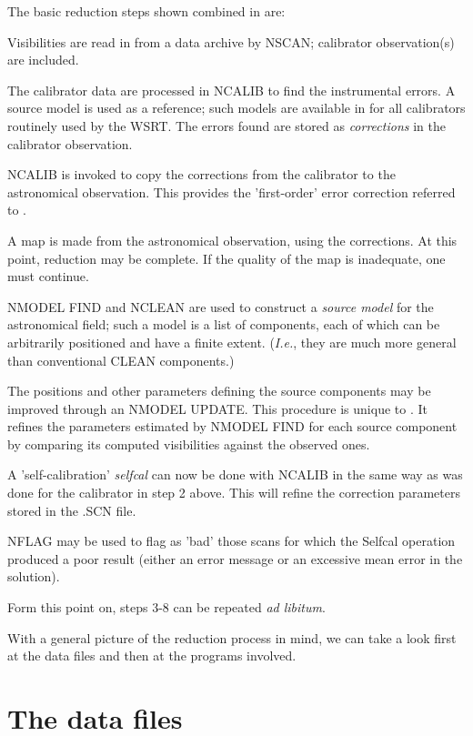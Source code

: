 	The basic reduction steps shown combined in 
are:
\bn
\item   Visibilities are read in from a data archive by NSCAN; calibrator
observation(s) are included.
\item   The calibrator data are processed in NCALIB to find the instrumental
errors. A source model is used as a reference; such models are available in
\NEWSTAR for all calibrators routinely used by the WSRT. The errors found are
stored as {\em corrections} in the calibrator observation.
\item   NCALIB is invoked to copy the corrections from the calibrator to the
astronomical observation. This provides the 'first-order' error correction
referred to .
\item   A map is made from the astronomical observation, using the corrections.
At this point, reduction may be complete. If the quality of the map is
inadequate, one must continue.
\item   NMODEL FIND and NCLEAN are used to construct a {\em source model} for
the astronomical field; such a model is a list of components, each of which can
be arbitrarily positioned and have a finite extent. ({\em I.e.}, they are much
more general than conventional CLEAN components.)
\item   The positions and other parameters defining the source components may
be improved through an NMODEL UPDATE. This procedure is unique to \NEWSTAR. It
refines the parameters estimated by NMODEL FIND for each source component by
comparing its computed visibilities against the observed ones.
\item   A 'self-calibration' {\em selfcal} can now be done with NCALIB in the
same way as was done for the calibrator in step 2 above. This will refine the
correction parameters stored in the .SCN file.
\item   NFLAG may be used to flag as 'bad' those scans for which the Selfcal
operation produced a poor result (either an error message or an excessive mean
error in the solution).
\item   Form this point on, steps 3-8 can be repeated {\em ad libitum}.
\en

	With a general picture of the reduction process in mind, we can take a
look first at the data files and then at the programs involved.


\section{ The \NEWSTAR data files }

